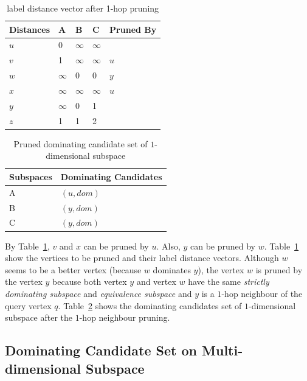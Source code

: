 \begin{table}[h]
    \centering
    \begin{tabular}{lllll}
    \hline
    Distances & A & B & C & Pruned By\\ \hline
    $u$       & 0 & $\infty$ & $\infty$ &\\ \hline
    $v$       & 1 & $\infty$ & $\infty$ & $u$\\ \hline
    $w$       & $\infty$ & 0 & 0 & $y$\\ \hline
    $x$       & $\infty$ & $\infty$ & $\infty$ & $u$\\ \hline
    $y$       & $\infty$ & 0 & 1 & \\ \hline
    $z$       & 1 & 1 & 2 &\\ \hline
    \end{tabular}
    \caption{\label{font-table} label distance vector after 1-hop pruning}
    \label{tab:lv_pruned}
\end{table}

\begin{table}[h]
    \centering
    \begin{tabular}{|l|l|}
    \hline
    Subspaces & Dominating Candidates \\ \hline
    A         & $(u, dom)$            \\ \hline
    B         & $(y, dom)$            \\ \hline
    C         & $(y, dom)$            \\ \hline
    \end{tabular}
    \caption{\label{font-table} Pruned dominating candidate set of $1$-dimensional subspace}
    \label{tab:dom_cand_pruned}
\end{table}

By Table~\ref{tab:lv_pruned}, $v$ and $x$ can be pruned by $u$. Also, $y$ can be pruned by $w$. Table~\ref{tab:lv_pruned} show the vertices to be pruned and their label distance vectors. Although $w$ seems to be a better vertex (because $w$ dominates $y$),  the vertex $w$ is pruned by the vertex $y$ because both vertex $y$ and vertex $w$ have the same \emph{strictly dominating subspace} and \emph{equivalence subspace} and $y$ is a $1$-hop neighbour of the query vertex $q$. Table~\ref{tab:dom_cand_pruned} shows the dominating candidates set of $1$-dimensional subspace after the $1$-hop neighbour pruning.

\subsection{Dominating Candidate Set on Multi-dimensional Subspace}

